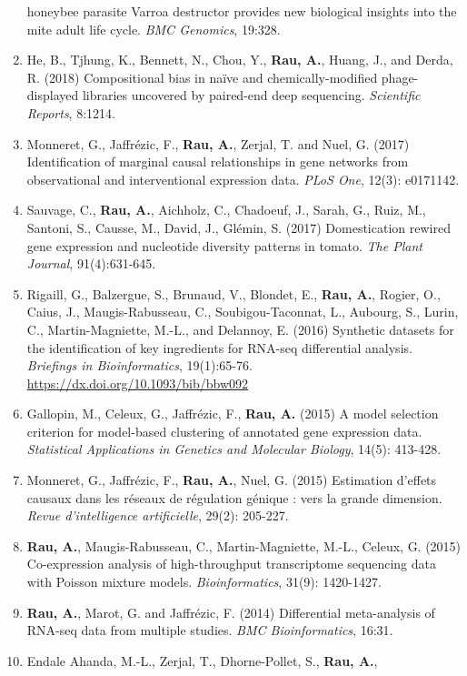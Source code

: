 \documentclass[11pt, a4paper]{awesome-cv}
\begin{document}
\begin{enumerate}
  honeybee parasite Varroa destructor provides new biological insights
  into the mite adult life cycle. \emph{BMC Genomics}, 19:328.
\item
  He, B., Tjhung, K., Bennett, N., Chou, Y., \textbf{Rau, A.}, Huang,
  J., and Derda, R. (2018) Compositional bias in naïve and
  chemically-modified phage-displayed libraries uncovered by paired-end
  deep sequencing. \emph{Scientific Reports}, 8:1214.
\item
  Monneret, G., Jaffrézic, F., \textbf{Rau, A.}, Zerjal, T. and Nuel, G.
  (2017) Identification of marginal causal relationships in gene
  networks from observational and interventional expression data.
  \emph{PLoS One}, 12(3): e0171142.
\item
  Sauvage, C., \textbf{Rau, A.}, Aichholz, C., Chadoeuf, J., Sarah, G.,
  Ruiz, M., Santoni, S., Causse, M., David, J., Glémin, S. (2017)
  Domestication rewired gene expression and nucleotide diversity
  patterns in tomato. \emph{The Plant Journal}, 91(4):631-645.
\item
  Rigaill, G., Balzergue, S., Brunaud, V., Blondet, E., \textbf{Rau,
  A.}, Rogier, O., Caius, J., Maugis-Rabusseau, C., Soubigou-Taconnat,
  L., Aubourg, S., Lurin, C., Martin-Magniette, M.-L., and Delannoy, E.
  (2016) Synthetic datasets for the identification of key ingredients
  for RNA-seq differential analysis. \emph{Briefings in Bioinformatics},
  19(1):65-76. \url{https://dx.doi.org/10.1093/bib/bbw092}
\item
  Gallopin, M., Celeux, G., Jaffrézic, F., \textbf{Rau, A.} (2015) A
  model selection criterion for model-based clustering of annotated gene
  expression data. \emph{Statistical Applications in Genetics and
  Molecular Biology}, 14(5): 413-428.
\item
  Monneret, G., Jaffrézic, F., \textbf{Rau, A.}, Nuel, G. (2015)
  Estimation d'effets causaux dans les réseaux de régulation génique :
  vers la grande dimension. \emph{Revue d'intelligence artificielle},
  29(2): 205-227.
\item
  \textbf{Rau, A.}, Maugis-Rabusseau, C., Martin-Magniette, M.-L.,
  Celeux, G. (2015) Co-expression analysis of high-throughput
  transcriptome sequencing data with Poisson mixture models.
  \emph{Bioinformatics}, 31(9): 1420-1427.
\item
  \textbf{Rau, A.}, Marot, G. and Jaffrézic, F. (2014) Differential
  meta-analysis of RNA-seq data from multiple studies. \emph{BMC
  Bioinformatics}, 16:31.
\item
  Endale Ahanda, M.-L., Zerjal, T., Dhorne-Pollet, S., \textbf{Rau, A.},

\end{enumerate}
\end{document}
